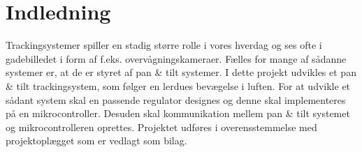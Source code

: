 \section*{Indledning}
Trackingsystemer spiller en stadig større rolle i vores hverdag og ses ofte i gadebilledet i form 
af f.eks. overvågningskameraer.
Fælles for mange af sådanne systemer er, at de er styret af pan \& tilt systemer. 
I dette projekt udvikles et pan \& tilt trackingsystem, som følger en lerdues bevægelse i 
luften. For at udvikle et sådant system skal en passende regulator designes og denne skal implementeres
på en mikrocontroller. 
Desuden skal kommunikation mellem pan \& tilt systemet og mikrocontrolleren oprettes.
Projektet udføres i overensstemmelse med projektoplægget som er vedlagt 
som bilag.
